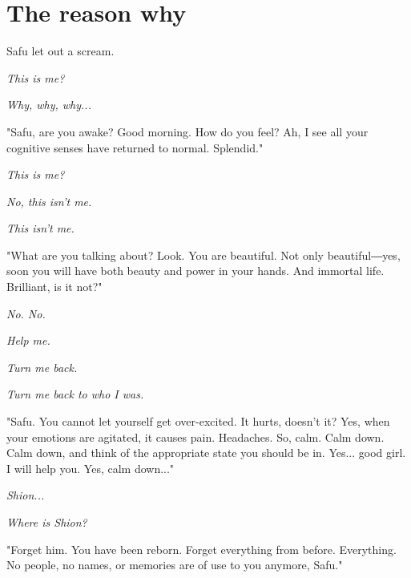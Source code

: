 
\chapter{The reason why}


Safu let out a scream.

\emph{This is me?}

\emph{Why, why, why...}

"Safu, are you awake? Good morning. How do you feel? Ah, I see all your
cognitive senses have returned to normal. Splendid."

\emph{This is me?}

\emph{No, this isn't me.}

\emph{This isn't me.}

"What are you talking about? Look. You are beautiful. Not only
beautiful―yes, soon you will have both beauty and power in your hands.
And immortal life. Brilliant, is it not?"

\emph{No. No.}

\emph{Help me.}

\emph{Turn me back.}

\emph{Turn me back to who I was.}

"Safu. You cannot let yourself get over-excited. It hurts, doesn't it?
Yes, when your emotions are agitated, it causes pain. Headaches. So,
calm. Calm down. Calm down, and think of the appropriate state you
should be in. Yes... good girl. I will help you. Yes, calm down..."

\emph{Shion...}

\emph{Where is Shion?}

"Forget him. You have been reborn. Forget everything from before.
Everything. No people, no names, or memories are of use to you anymore,
Safu."

